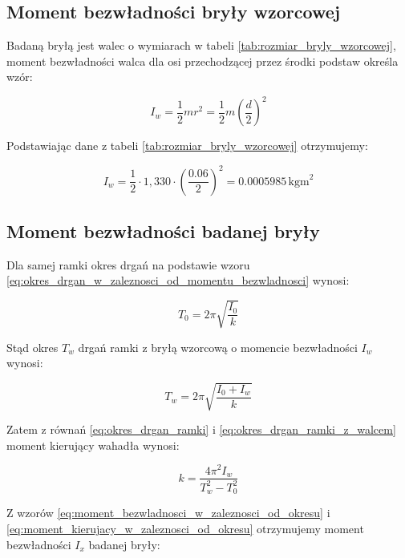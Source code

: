 \documentclass[a4paper,12pt]{article}
\begin{document}
\subsection{Moment bezwładności bryły wzorcowej}

Badaną bryłą jest walec o wymiarach w tabeli \ref{tab:rozmiar_bryly_wzorcowej}, moment bezwładności walca dla osi przechodzącej przez środki podstaw określa wzór:

\begin{equation} \label{eq:moment_bezwladnosci_walca}
    I_w = \frac{1}{2}mr^2 = \frac{1}{2}m\left(\frac{d}{2}\right)^2
\end{equation}

Podstawiając dane z tabeli \ref{tab:rozmiar_bryly_wzorcowej} otrzymujemy:

\begin{equation} \label{eq:moment_bezwladnosci_walca_wartosc}
    I_w = \frac{1}{2} \cdot 1,330 \cdot \left(\frac{0.06}{2}\right)^2 = 0.0005985\,\text{kgm}^2
\end{equation}


\subsection{Moment bezwładności badanej bryły} \label{sec:moment_bezwladnosci_badanej_bryly}

Dla samej ramki okres drgań na podstawie wzoru \ref{eq:okres_drgan_w_zaleznosci_od_momentu_bezwladnosci} wynosi:

\begin{equation} \label{eq:okres_drgan_ramki}
    T_0 = 2\pi \sqrt{\frac{I_0}{k}}
\end{equation}

Stąd okres $T_w$ drgań ramki z bryłą wzorcową o momencie bezwładności $I_w$ wynosi:

\begin{equation} \label{eq:okres_drgan_ramki_z_walcem}
    T_w = 2\pi \sqrt{\frac{I_0 + I_w}{k}}
\end{equation}

Zatem z równań \eqref{eq:okres_drgan_ramki} i \eqref{eq:okres_drgan_ramki_z_walcem} moment kierujący wahadła wynosi:

\begin{equation} \label{eq:moment_kierujacy_w_zaleznosci_od_okresu}
    k = \frac{4\pi^2 I_w}{T_w^2 - T_0^2}
\end{equation}

Z wzorów \eqref{eq:moment_bezwladnosci_w_zaleznosci_od_okresu} i \eqref{eq:moment_kierujacy_w_zaleznosci_od_okresu} otrzymujemy moment bezwładności $I_x$ badanej bryły:
\end{document}
